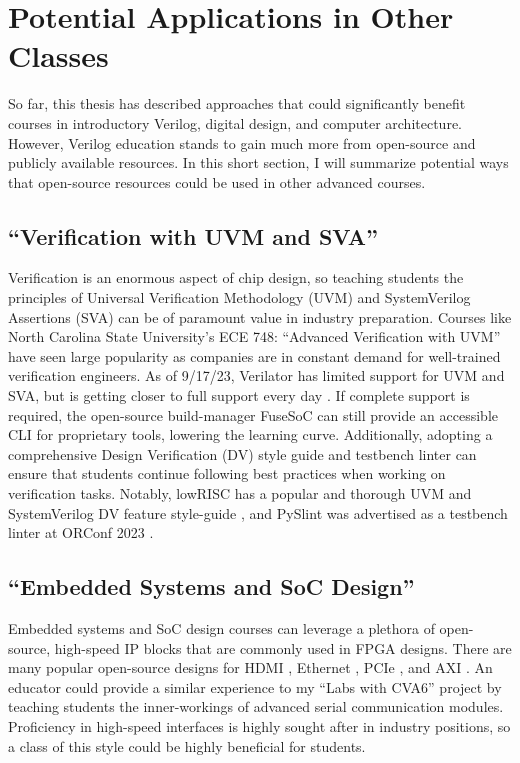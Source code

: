 
\chapter{Potential Applications in Other Classes}
\label{chapter:other_classes}

So far, this thesis has described approaches that could significantly benefit courses in introductory Verilog, digital design, and computer architecture. However, Verilog education stands to gain much more from open-source and publicly available resources. In this short section, I will summarize potential ways that open-source resources could be used in other advanced courses.

\section{\enquote{Verification with UVM and SVA}}

Verification is an enormous aspect of chip design, so teaching students the principles of Universal Verification Methodology (UVM) and SystemVerilog Assertions (SVA) can be of paramount value in industry preparation. Courses like North Carolina State University's ECE 748: \enquote{Advanced Verification with UVM} have seen large popularity as companies are in constant demand for well-trained verification engineers. As of 9/17/23, Verilator has limited support for UVM and SVA, but is getting closer to full support every day \cite{VerilatorUVM, BieganskiORConf, VerilatorSVA}. If complete support is required, the open-source build-manager FuseSoC can still provide an accessible CLI for proprietary tools, lowering the learning curve. Additionally, adopting a comprehensive Design Verification (DV) style guide and testbench linter can ensure that students continue following best practices when working on verification tasks. Notably, lowRISC has a popular and thorough UVM and SystemVerilog DV feature style-guide \cite{lowRISCstyleguides}, and PySlint was advertised as a testbench linter at ORConf 2023 \cite{paulORConf}.

\section{\enquote{Embedded Systems and SoC Design}}

Embedded systems and SoC design courses can leverage a plethora of open-source, high-speed IP blocks that are commonly used in FPGA designs. There are many popular open-source designs for HDMI \cite{hdlutilhdmiGitHub, projfdisplaycontrollerGitHub, cliffordwolfSimpleVOutGitHub}, Ethernet \cite{alexforencichverilogethernetGitHub}, PCIe \cite{alexforencichverilogpcieGitHub, enjoydigitallitepcieGitHub}, and AXI \cite{pulpplatformaxiGitHub, alexforencichverilogaxiGitHub}. An educator could provide a similar experience to my \enquote{Labs with CVA6} project by teaching students the inner-workings of advanced serial communication modules. Proficiency in high-speed interfaces is highly sought after in industry positions, so a class of this style could be highly beneficial for students.

